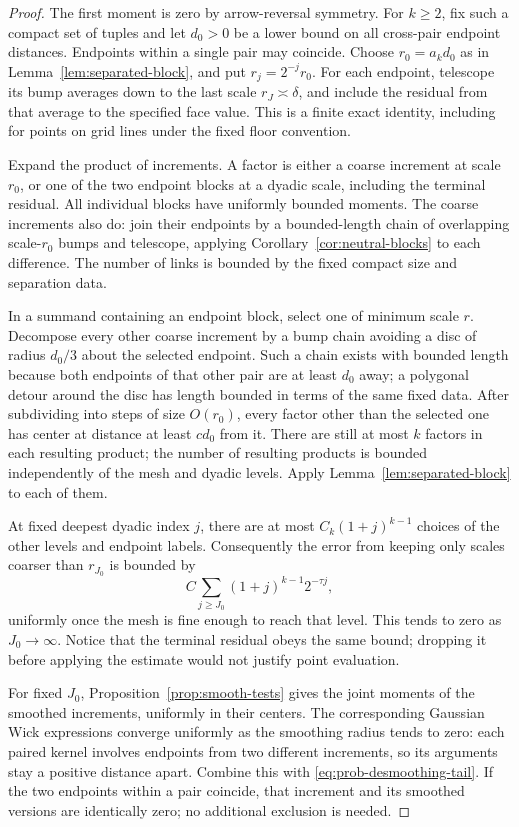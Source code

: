 \begin{proof}
The first moment is zero by arrow-reversal symmetry. For \(k\ge2\),
fix such a compact set of tuples and let \(d_0>0\) be a lower bound on
all cross-pair endpoint distances. Endpoints within a single pair may
coincide. Choose \(r_0=a_kd_0\) as in
Lemma~\ref{lem:separated-block}, and put \(r_j=2^{-j}r_0\).
For each endpoint, telescope its bump averages down to the last scale
\(r_J\asymp\delta\), and include the residual from that average to the
specified face value. This is a finite exact identity, including for
points on grid lines under the fixed floor convention.

Expand the product of increments. A factor is either a coarse
increment at scale \(r_0\), or one of the two endpoint blocks at a
dyadic scale, including the terminal residual. All individual blocks
have uniformly bounded moments. The coarse increments also do: join
their endpoints by a bounded-length chain of overlapping scale-\(r_0\)
bumps and telescope, applying Corollary~\ref{cor:neutral-blocks} to
each difference. The number of links is bounded by the fixed compact
size and separation data.

In a summand containing an endpoint block, select one of minimum scale
\(r\). Decompose every other coarse increment by a bump chain avoiding
a disc of radius \(d_0/3\) about the selected endpoint. Such a chain
exists with bounded length because both endpoints of that other pair
are at least \(d_0\) away; a polygonal detour around the disc has length
bounded in terms of the same fixed data. After subdividing into steps
of size \(O(r_0)\), every factor other than the selected one has center
at distance at least \(c d_0\) from it. There are still at most \(k\)
factors in each resulting product; the number of resulting products is
bounded independently of the mesh and dyadic levels. Apply
Lemma~\ref{lem:separated-block} to each of them.

At fixed deepest dyadic index \(j\), there are at most
\(C_k(1+j)^{k-1}\) choices of the other levels and endpoint labels.
Consequently the error from keeping only scales coarser than \(r_{J_0}\)
is bounded by
\begin{equation}\label{eq:prob-desmoothing-tail}
 C\sum_{j\ge J_0}(1+j)^{k-1}2^{-\tau j},
\end{equation}
uniformly once the mesh is fine enough to reach that level. This tends
to zero as \(J_0\to\infty\). Notice that the terminal residual obeys
the same bound; dropping it before applying the estimate would not
justify point evaluation.

For fixed \(J_0\), Proposition~\ref{prop:smooth-tests} gives the joint
moments of the smoothed increments, uniformly in their centers.
The corresponding Gaussian Wick expressions converge uniformly as the
smoothing radius tends to zero: each paired kernel involves endpoints
from two different increments, so its arguments stay a positive
distance apart. Combine this with \eqref{eq:prob-desmoothing-tail}.
If the two endpoints within a pair coincide, that increment and its
smoothed versions are identically zero; no additional exclusion is
needed.
\end{proof}

